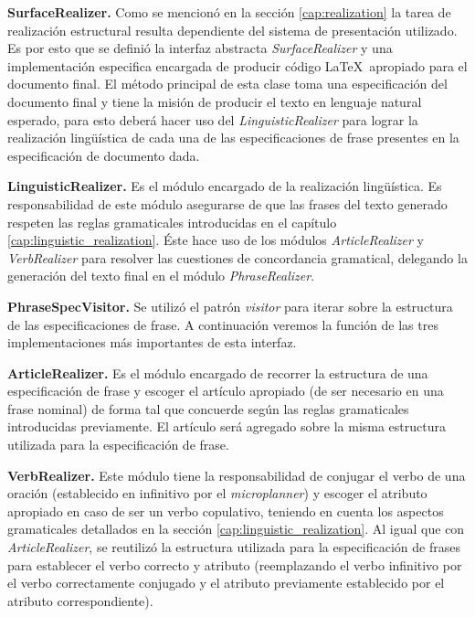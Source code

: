 \bigskip
\noindent
\textbf{SurfaceRealizer.} Como se mencionó en la sección \ref{cap:realization} la tarea de realización estructural resulta dependiente del sistema de presentación utilizado. Es por esto que se definió la interfaz abstracta \textit{SurfaceRealizer} y una implementación especifica encargada de producir código \LaTeX~apropiado para el documento final. El método principal de esta clase toma una especificación del documento final y tiene la misión de producir el texto en lenguaje natural esperado, para esto deberá hacer uso del \textit{LinguisticRealizer} para lograr la realización lingüística de cada una de las especificaciones de frase presentes en la especificación de documento dada. 


\bigskip
\noindent
\textbf{LinguisticRealizer.} Es el módulo encargado de la realización lingüística. Es responsabilidad de este módulo asegurarse de que las frases del texto generado respeten las reglas gramaticales introducidas en el capítulo \ref{cap:linguistic_realization}. Éste hace uso de los módulos \textit{ArticleRealizer} y \textit{VerbRealizer} para resolver las cuestiones de concordancia gramatical, delegando la generación del texto final en el módulo \textit{PhraseRealizer}. 

\bigskip
\noindent
\textbf{PhraseSpecVisitor.} Se utilizó el patrón \textit{visitor} para iterar sobre la estructura de las especificaciones de frase. A continuación veremos la función de las tres implementaciones más importantes de esta interfaz. 

\bigskip
\noindent
\textbf{ArticleRealizer.} Es el módulo encargado de recorrer la estructura de una especificación de frase y escoger el artículo apropiado (de ser necesario en una frase nominal) de forma tal que concuerde según las reglas gramaticales introducidas previamente. El artículo será agregado sobre la misma estructura utilizada para la especificación de frase.

\bigskip
\noindent
\textbf{VerbRealizer.} Este módulo tiene la responsabilidad de conjugar el verbo de una oración (establecido en infinitivo por el \textit{microplanner}) y escoger el atributo apropiado en caso de ser un verbo copulativo, teniendo en cuenta los aspectos gramaticales detallados en la sección \ref{cap:linguistic_realization}. Al igual que con \textit{ArticleRealizer}, se reutilizó la estructura utilizada para la especificación de frases para establecer el verbo correcto y atributo (reemplazando el verbo infinitivo por el verbo correctamente conjugado y el atributo previamente establecido por el atributo correspondiente).

